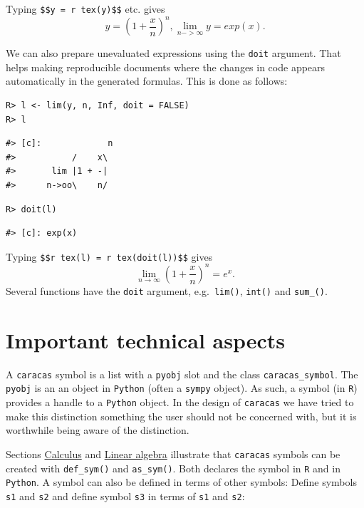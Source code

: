 Typing \texttt{\$\$y\ =\ \textasciigrave{}r\ tex(y)\textasciigrave{}\$\$} etc. gives
\[
y = \left(1 + \frac{x}{n}\right)^{n}, \lim_{n->\infty} y = exp(x) .
\]

We can also prepare unevaluated expressions using the \texttt{doit}
argument. That helps making reproducible documents where the changes
in code appears automatically in the generated formulas.
This is done as follows:

\begin{verbatim}
R> l <- lim(y, n, Inf, doit = FALSE)
R> l
\end{verbatim}

\begin{verbatim}
#> [c]:             n
#>           /    x\ 
#>       lim |1 + -| 
#>      n->oo\    n/
\end{verbatim}

\begin{verbatim}
R> doit(l)
\end{verbatim}

\begin{verbatim}
#> [c]: exp(x)
\end{verbatim}

Typing \texttt{\$\$\textasciigrave{}r\ tex(l)\textasciigrave{}\ =\ \textasciigrave{}r\ tex(doit(l))\textasciigrave{}\$\$} gives
\[
\lim_{n \to \infty} \left(1 + \frac{x}{n}\right)^{n} = e^{x} .
\]
Several functions have the \texttt{doit} argument, e.g.~\texttt{lim()}, \texttt{int()} and \texttt{sum\_()}.

\hypertarget{important-technical-aspects}{%
\section{Important technical aspects}\label{important-technical-aspects}}

A \texttt{caracas} symbol is a list with a \texttt{pyobj} slot and the class
\texttt{caracas\_symbol}. The \texttt{pyobj} is an an object in \texttt{Python}
(often a \texttt{sympy} object). As such, a symbol (in \texttt{R})
provides a handle to a \texttt{Python} object. In the design of
\texttt{caracas} we have tried to make this distinction something the
user should not be concerned with, but it is worthwhile being aware of
the distinction.

Sections \protect\hyperlink{calculus}{Calculus} and \protect\hyperlink{linear-algebra}{Linear algebra} illustrate that \texttt{caracas} symbols can
be created with \texttt{def\_sym()} and \texttt{as\_sym()}. Both declares the
symbol in \texttt{R} and in \texttt{Python}. A symbol can also be
defined in terms of other symbols:
Define symbols \texttt{s1} and \texttt{s2} and define symbol \texttt{s3} in terms of \texttt{s1} and \texttt{s2}:

